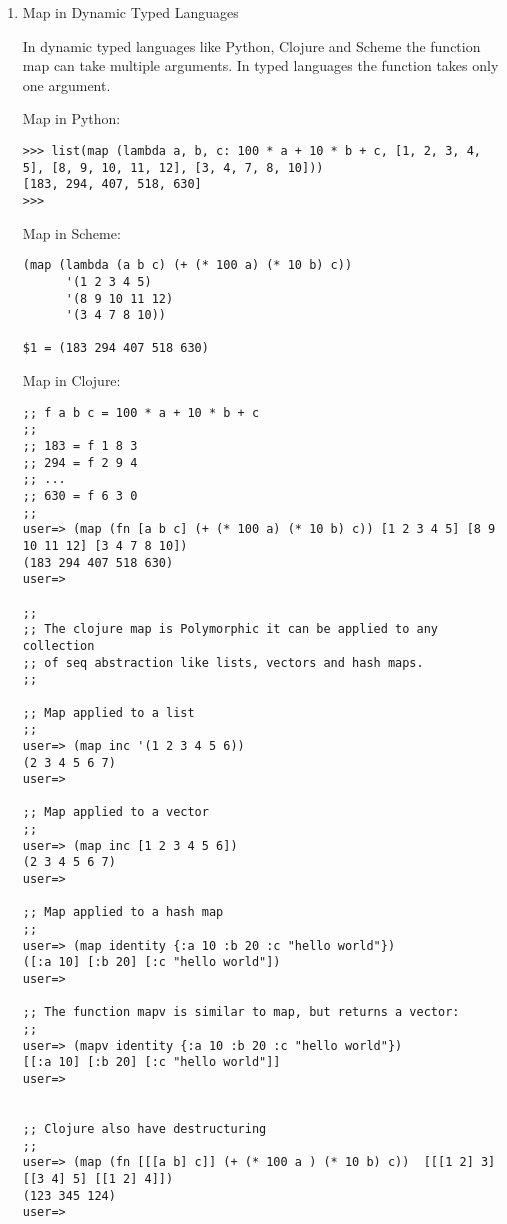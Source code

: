 \documentclass[11pt]{article}
\begin{document}
\begin{enumerate}
\begin{verbatim}
 # The function curry2 currify a function of two arguments
 #
>>> strict_map_c = curry2(strict_map) 

>>> strict_map_c(fun1)
<function <lambda>.<locals>.<lambda>.<locals>.<lambda> at 0xb6afc0bc>

>>> strict_map_c(fun1)([1, 2, 3, 4])
[9, 12, 15, 18]
>>> 

>>> fun1_xs = strict_map_c(fun1)
>>> fun1_xs ([1, 2, 3, 4])
[9, 12, 15, 18]
>>>
\end{verbatim}

\item Map in Dynamic Typed Languages
\label{sec-1-9-2-0-4}

In dynamic typed languages like Python, Clojure and Scheme the function map
can take multiple arguments. In typed languages the function 
takes only one argument.

Map in Python:

\begin{verbatim}
>>> list(map (lambda a, b, c: 100 * a + 10 * b + c, [1, 2, 3, 4, 5], [8, 9, 10, 11, 12], [3, 4, 7, 8, 10]))
[183, 294, 407, 518, 630]
>>>
\end{verbatim}


Map in Scheme: 

\begin{verbatim}
(map (lambda (a b c) (+ (* 100 a) (* 10 b) c)) 
      '(1 2 3 4 5) 
      '(8 9 10 11 12) 
      '(3 4 7 8 10))

$1 = (183 294 407 518 630)
\end{verbatim}

Map in Clojure:

\begin{verbatim}
;; f a b c = 100 * a + 10 * b + c
;; 
;; 183 = f 1 8 3 
;; 294 = f 2 9 4 
;; ...
;; 630 = f 6 3 0
;;
user=> (map (fn [a b c] (+ (* 100 a) (* 10 b) c)) [1 2 3 4 5] [8 9 10 11 12] [3 4 7 8 10])
(183 294 407 518 630)
user=> 

;;
;; The clojure map is Polymorphic it can be applied to any collection 
;; of seq abstraction like lists, vectors and hash maps.
;;

;; Map applied to a list  
;;
user=> (map inc '(1 2 3 4 5 6))
(2 3 4 5 6 7)
user=> 

;; Map applied to a vector 
;;
user=> (map inc [1 2 3 4 5 6])
(2 3 4 5 6 7)
user=> 

;; Map applied to a hash map 
;;
user=> (map identity {:a 10 :b 20 :c "hello world"})
([:a 10] [:b 20] [:c "hello world"])
user=> 

;; The function mapv is similar to map, but returns a vector: 
;;
user=> (mapv identity {:a 10 :b 20 :c "hello world"})
[[:a 10] [:b 20] [:c "hello world"]]
user=> 


;; Clojure also have destructuring 
;;
user=> (map (fn [[[a b] c]] (+ (* 100 a ) (* 10 b) c))  [[[1 2] 3] [[3 4] 5] [[1 2] 4]])
(123 345 124)
user=>
\end{verbatim}
\end{enumerate}
\end{document}

